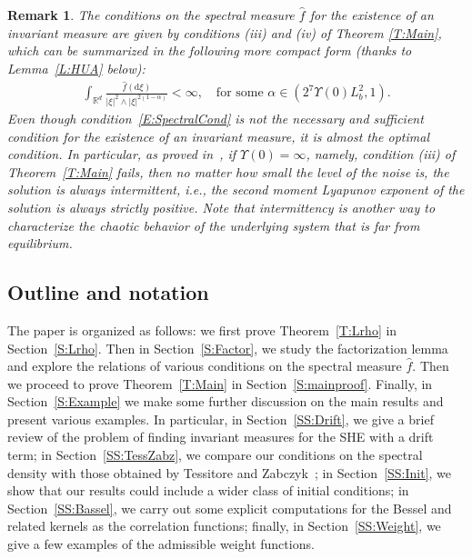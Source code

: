 \documentclass[sn-mathphys]{sn-jnl}%
\renewcommand{\R}{\mathbb{R}}
\newcommand{\ud}{\ensuremath{\mathrm{d}}}
\numberwithin{equation}{section}
\theoremstyle{thmstyleone}%
\theoremstyle{thmstyletwo}%
\newtheorem{remark}{Remark}[section]%
\theoremstyle{thmstylethree}%
\begin{document}
\begin{remark}\label{R:CompactForm}
  The conditions on the spectral measure $\widehat{f}$ for the existence of an invariant measure are
  given by conditions (iii) and (iv) of Theorem \ref{T:Main}, which can be summarized in the
  following more compact form (thanks to Lemma~\ref{L:HUA} below):
  \begin{align}\label{E:SpectralCond}
    \int_{\R^d} \frac{\widehat{f}(\ud\xi)}{\lvert \xi \rvert^2 \wedge \lvert \xi \rvert^{2(1-\alpha)}}<\infty,
    \quad \text{for some $\alpha\in \left(2^7\Upsilon(0)L_b^2,1\right)$.}
  \end{align}
  Even though condition~\eqref{E:SpectralCond} is not the necessary and sufficient condition for the
  existence of an invariant measure, it is almost the optimal condition. In particular, as proved
  in~\cite{chen.kim:19:nonlinear}, if $\Upsilon(0) = \infty$, namely, condition (iii) of
  Theorem~\ref{T:Main} fails, then no matter how small the level of the noise is, the solution is
  always intermittent, i.e., the second moment Lyapunov exponent of the solution is always strictly
  positive. Note that intermittency is another way to characterize the chaotic behavior of the
  underlying system that is far from equilibrium.
\end{remark}

\subsection{Outline and notation}

The paper is organized as follows: we first prove Theorem~\ref{T:Lrho} in Section~\ref{S:Lrho}. Then
in Section~\ref{S:Factor}, we study the factorization lemma and explore the relations of various
conditions on the spectral measure $\widehat{f}$. Then we proceed to prove Theorem~\ref{T:Main} in
Section~\ref{S:mainproof}. Finally, in Section~\ref{S:Example} we make some further discussion on
the main results and present various examples. In particular, in Section~\ref{SS:Drift}, we give a
brief review of the problem of finding invariant measures for the SHE with a drift term; in
Section~\ref{SS:TessZabz}, we compare our conditions on the spectral density with those obtained by
Tessitore and Zabczyk~\cite{tessitore.zabczyk:98:invariant}; in Section~\ref{SS:Init}, we show that
our results could include a wider class of initial conditions; in Section~\ref{SS:Bassel}, we carry
out some explicit computations for the Bessel and related kernels as the correlation functions;
finally, in Section~\ref{SS:Weight}, we give a few examples of the admissible weight functions.
\end{document}
